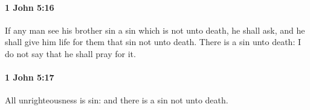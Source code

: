 		\paragraph{1 John 5:16} %
			\label{1JOHN-5-16}

			If any man see his brother sin a sin which is not unto death, he shall ask, and he shall give him life for them that sin not unto death.  There is a sin unto death: I do not say that he shall pray for it.

			\begin{framed}
			\scriptsize
				\begin{compactdesc}
					\item[SBLG] 
				\end{compactdesc}
			\end{framed}

		\paragraph{1 John 5:17} %
			\label{1JOHN-5-17}

			All unrighteousness is sin: and there is a sin not unto death.
			
